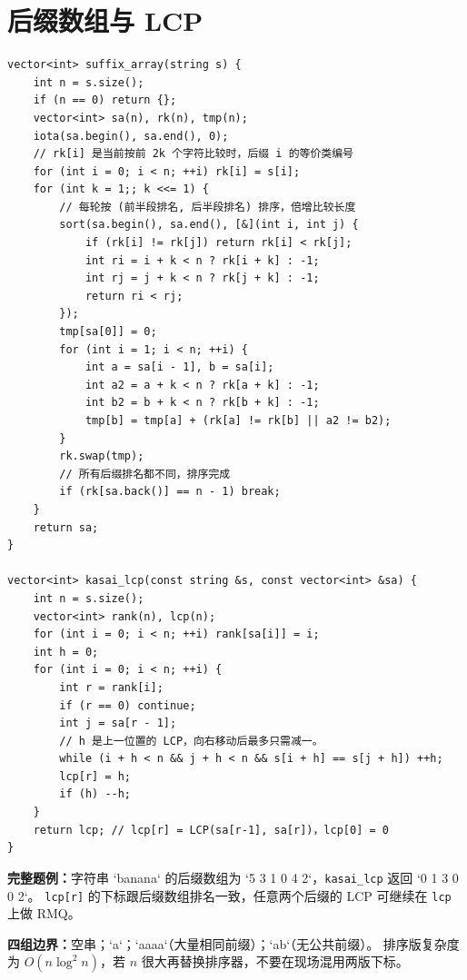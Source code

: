 \section{后缀数组与 LCP}


\begin{lstlisting}[style=cpp]
vector<int> suffix_array(string s) {
    int n = s.size();
    if (n == 0) return {};
    vector<int> sa(n), rk(n), tmp(n);
    iota(sa.begin(), sa.end(), 0);
    // rk[i] 是当前按前 2k 个字符比较时，后缀 i 的等价类编号
    for (int i = 0; i < n; ++i) rk[i] = s[i];
    for (int k = 1;; k <<= 1) {
        // 每轮按 (前半段排名, 后半段排名) 排序，倍增比较长度
        sort(sa.begin(), sa.end(), [&](int i, int j) {
            if (rk[i] != rk[j]) return rk[i] < rk[j];
            int ri = i + k < n ? rk[i + k] : -1;
            int rj = j + k < n ? rk[j + k] : -1;
            return ri < rj;
        });
        tmp[sa[0]] = 0;
        for (int i = 1; i < n; ++i) {
            int a = sa[i - 1], b = sa[i];
            int a2 = a + k < n ? rk[a + k] : -1;
            int b2 = b + k < n ? rk[b + k] : -1;
            tmp[b] = tmp[a] + (rk[a] != rk[b] || a2 != b2);
        }
        rk.swap(tmp);
        // 所有后缀排名都不同，排序完成
        if (rk[sa.back()] == n - 1) break;
    }
    return sa;
}

vector<int> kasai_lcp(const string &s, const vector<int> &sa) {
    int n = s.size();
    vector<int> rank(n), lcp(n);
    for (int i = 0; i < n; ++i) rank[sa[i]] = i;
    int h = 0;
    for (int i = 0; i < n; ++i) {
        int r = rank[i];
        if (r == 0) continue;
        int j = sa[r - 1];
        // h 是上一位置的 LCP，向右移动后最多只需减一。
        while (i + h < n && j + h < n && s[i + h] == s[j + h]) ++h;
        lcp[r] = h;
        if (h) --h;
    }
    return lcp; // lcp[r] = LCP(sa[r-1], sa[r])，lcp[0] = 0
}
\end{lstlisting}

\begin{card}
\textbf{完整题例：}字符串 `banana` 的后缀数组为
`5 3 1 0 4 2`，\texttt{kasai\_lcp} 返回 `0 1 3 0 0 2`。
\texttt{lcp[r]} 的下标跟后缀数组排名一致，任意两个后缀的 LCP 可继续在
\texttt{lcp} 上做 RMQ。

\textbf{四组边界：}空串；`a`；`aaaa`（大量相同前缀）；`ab`（无公共前缀）。
排序版复杂度为 \(O(n\log^2 n)\)，若 \(n\) 很大再替换排序器，不要在现场混用两版下标。
\end{card}

